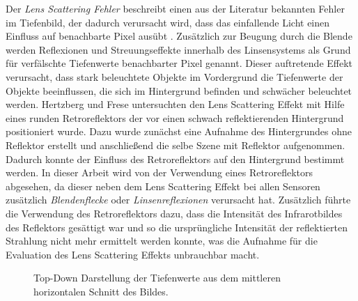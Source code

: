 \documentclass[thesis.tex]{subfiles}
\begin{document}
Der \emph{Lens Scattering Fehler} beschreibt einen aus der Literatur bekannten Fehler im Tiefenbild, der dadurch verursacht wird, dass das einfallende Licht einen Einfluss auf benachbarte Pixel ausübt \cite{bib:Hertzberg2014}\cite{bib:Jamtsho2010}\cite{bib:Mure-Dubois2007}\cite{bib:Mure-Dubois2009}. Zusätzlich zur Beugung durch die Blende werden Reflexionen und Streuungseffekte innerhalb des Linsensystems als Grund für verfälschte Tiefenwerte benachbarter Pixel genannt. Dieser auftretende Effekt verursacht, dass stark beleuchtete Objekte im Vordergrund die Tiefenwerte der Objekte beeinflussen, die sich im Hintergrund befinden und schwächer beleuchtet werden. Hertzberg und Frese \cite{bib:Hertzberg2014} untersuchten den Lens Scattering Effekt mit Hilfe eines runden Retroreflektors der vor einen schwach reflektierenden Hintergrund positioniert wurde. Dazu wurde zunächst eine Aufnahme des Hintergrundes ohne Reflektor erstellt und anschließend die selbe Szene mit Reflektor aufgenommen. Dadurch konnte der Einfluss des Retroreflektors auf den Hintergrund bestimmt werden. In dieser Arbeit wird von der Verwendung eines Retroreflektors abgesehen, da dieser neben dem Lens Scattering Effekt bei allen Sensoren zusätzlich \emph{Blendenflecke} oder \emph{Linsenreflexionen} verursacht hat. Zusätzlich führte die Verwendung des Retroreflektors dazu, dass die Intensität des Infrarotbildes des Reflektors gesättigt war und so die ursprüngliche Intensität der reflektierten Strahlung nicht mehr ermittelt werden konnte, was die Aufnahme für die Evaluation des Lens Scattering Effekts unbrauchbar macht. 

\begin{figure}[h!]
\centering
{}
\caption{Top-Down Darstellung der Tiefenwerte aus dem mittleren horizontalen Schnitt des Bildes.}
\label{fig:lens_scattering_evaluation_one}
\end{figure}
\end{document}
